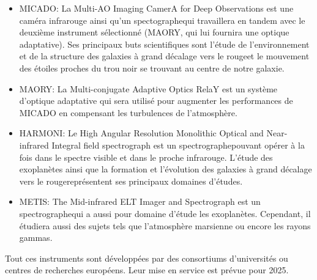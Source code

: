 \begin{itemize}
	
	\item MICADO: La Multi-AO Imaging CamerA for Deep Observations est une caméra infrarouge ainsi qu'un spectographe\footnotemark[2] qui travaillera en tandem avec le deuxième instrument sélectionné (MAORY, qui lui fournira une optique adaptative). Ses principaux buts scientifiques sont l'étude de l'environnement et de la structure des galaxies à grand décalage vers le rouge\footnotemark[3] et le mouvement des étoiles proches du trou noir se trouvant au centre de notre galaxie. 
	
	\item MAORY: La Multi-conjugate Adaptive Optics RelaY est un système d'optique adaptative qui sera utilisé pour augmenter les performances de MICADO en compensant les turbulences de l'atmosphère.
	
	\item HARMONI: Le High Angular Resolution Monolithic Optical and Near-infrared Integral field spectrograph est un spectrographe\footnotemark[2] pouvant opérer à la fois dans le spectre visible et dans le proche infrarouge. L'étude des exoplanètes ainsi que la formation et l'évolution des galaxies à grand décalage vers le rouge\footnotemark[3] représentent ses principaux domaines d'études.
	
	\item METIS: The Mid-infrared ELT Imager and Spectrograph est un spectrographe\footnotemark[2] qui a aussi pour domaine d'étude les exoplanètes. Cependant, il étudiera aussi des sujets tels que l'atmosphère marsienne ou encore les rayons gammas.
	
\end{itemize}

Tout ces instruments sont développées par des consortiums d'universités ou centres de recherches européens. Leur mise en service est prévue pour 2025.
	
\vfill


